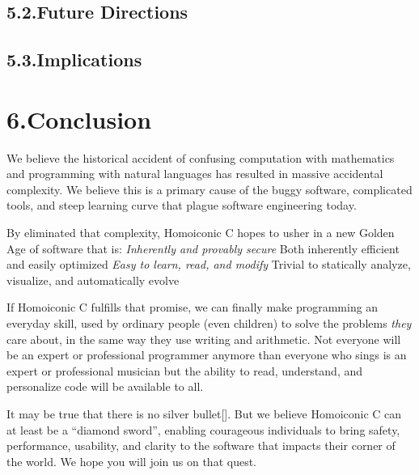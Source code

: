 \documentclass[preprint]{{acmart}}
\begin{document}
\subsection{5.2.\hspace*{0.5em}Future Directions}\label{sec-future-directions}%

\subsection{5.3.\hspace*{0.5em}Implications}\label{sec-implications}%

\section{6.\hspace*{0.5em}Conclusion}\label{sec-conclusion}%

\noindent{}We believe the historical accident of confusing computation with
mathematics and programming with natural languages has resulted in
massive accidental complexity. We believe this is a primary cause of the
buggy software, complicated tools, and steep learning curve that plague software
engineering today.%

By eliminated that complexity, Homoiconic C hopes to usher in a new
Golden Age of software that is:
\emph{ Inherently and provably secure 
} Both inherently efficient and easily optimized
\emph{ Easy to learn, read, and modify
} Trivial to statically analyze, visualize, and automatically evolve%

If Homoiconic C fulfills that promise, we can finally make programming an
everyday skill, used by ordinary people (even children) to solve the
problems \emph{they} care about, in the same way they use writing and
arithmetic. Not everyone will be an expert or professional programmer \textendash{}
anymore than everyone who sings is an expert or professional musician \textendash{}
but the ability to read, understand, and personalize code will be
available to all.%

It may be true that there is no silver bullet[].   But we believe
Homoiconic C can at least be a \textquotedblleft{}diamond sword\textquotedblright{}, enabling courageous individuals
to bring safety, performance, usability, and clarity to the software that
impacts their corner of the world.  We hope you will join us on that quest.%
\end{document}
